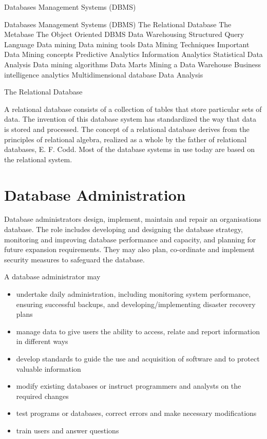 Databases Management Systems (DBMS)

Databases Management Systems (DBMS)
The Relational Database
The Metabase
The Object Oriented DBMS
Data Warehousing
Structured Query Language
Data mining
Data mining tools
Data Mining Techniques
Important Data Mining concepts
Predictive Analytics
Information Analytics
Statistical Data Analysis
Data mining algorithms
Data Marts
Mining a Data Warehouse
Business intelligence analytics
Multidimensional database
Data Analysis

The Relational Database

A relational database consists of a collection of tables that store particular sets of data. The invention of this database system has standardized the way that data is stored and processed. The concept of a relational database derives from the principles of relational algebra, realized as a whole by the father of relational databases, E. F. Codd. Most of the database systems in use today are based on the relational system.



\section{Database Administration}
Database administrators design, implement, maintain and repair an organisations database. The role includes developing and designing the database strategy, monitoring and improving database performance and capacity, and planning for future expansion requirements. They may also plan, co-ordinate and implement security measures to safeguard the database.

A database administrator may
\begin{itemize}
\item undertake daily administration, including monitoring system performance, ensuring successful backups, and developing/implementing disaster recovery plans
\item manage data to give users the ability to access, relate and report information in different ways
\item develop standards to guide the use and acquisition of software and to protect valuable information
\item modify existing databases or instruct programmers and analysts on the required changes
\item test programs or databases, correct errors and make necessary modifications
\item train users and answer questions
\end{itemize}

